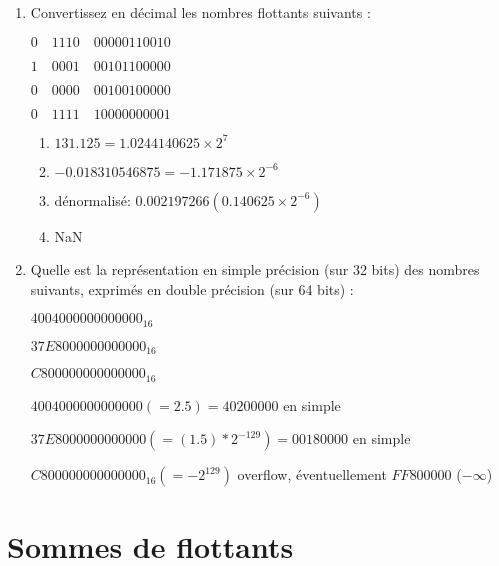 \documentclass[a4paper,10pt]{exam}
\begin{document}
\begin{enumerate}
\item Convertissez en d\'ecimal les nombres flottants suivants  :

$0\quad 1110\quad 00000110010$

$1\quad 0001\quad 00101100000$

$0\quad 0000\quad 00100100000$

$0\quad 1111\quad 10000000001$

\begin{solution}

\begin{enumerate}
  \item $131.125 = 1.0244140625 \times 2^{7}$
  \item $-0.018310546875 = -1.171875 \times 2^{-6}$
  \item dénormalisé: $0.002197266 (0.140625 \times 2^{-6})$
  \item NaN
\end{enumerate}

\end{solution}

\item Quelle est la repr\'esentation en simple pr\'ecision (sur 32 bits) des nombres suivants, exprim\'es en double pr\'ecision (sur 64 bits) :

$4004000000000000_{16}$

$37E8000000000000_{16}$

$C800000000000000_{16}$

\begin{solution}
$4004000000000000 (= 2.5) = 40200000$ en simple

$37E8000000000000 (= (1.5)*2^{-129}) = 00180000$ en simple

$C800000000000000_{16} (=-2^{129})$ overflow, \'eventuellement $FF800000$ ($-\infty$)

\end{solution}

\end{enumerate}

\pagebreak
\section{Sommes de flottants}
\end{document}
